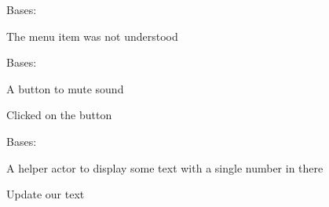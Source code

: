 \documentclass[letterpaper,10pt,english]{sphinxmanual}
\begin{document}
\begin{fulllineitems}
\label{blocks:serge.blocks.actors.InvalidMenuItem}
Bases: 

The menu item was not understood

\end{fulllineitems}


\begin{fulllineitems}
\label{blocks:serge.blocks.actors.MuteButton}
Bases: {\hyperref[actor:serge.actor.Actor]{}}

A button to mute sound

\begin{fulllineitems}
\label{blocks:serge.blocks.actors.MuteButton.toggleSound}
Clicked on the button

\end{fulllineitems}


\end{fulllineitems}


\begin{fulllineitems}
\label{blocks:serge.blocks.actors.NumericText}
Bases: {\hyperref[blocks:serge.blocks.actors.FormattedText]{}}

A helper actor to display some text with a single number in there

\begin{fulllineitems}
\label{blocks:serge.blocks.actors.NumericText.updateText}
Update our text

\end{fulllineitems}


\begin{fulllineitems}
\label{blocks:serge.blocks.actors.NumericText.value}
\end{fulllineitems}


\end{fulllineitems}
\end{document}
